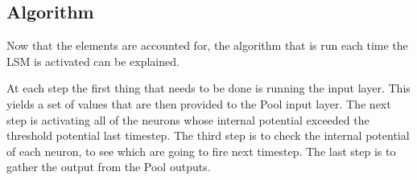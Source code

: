 \subsection{Algorithm}

Now that the elements are accounted for, the algorithm that is run each time the LSM is activated can be explained.

At each step the first thing that needs to be done is running the input layer. This yields a set of values that are then provided to the Pool input layer.
The next step is activating all of the neurons whose internal potential exceeded the threshold potential last timestep.
The third step is to check the internal potential of each neuron, to see which are going to fire next timestep.
The last step is to gather the output from the Pool outputs.

